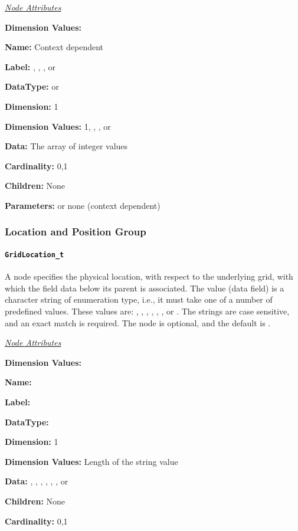 \textit{\uline{Node Attributes}}
\begin{Ventryic}{\textbf{Dimension Values:}}
\raggedright
\item [\textbf{Name:}]
      Context dependent
\item [\textbf{Label:}]
      , , ,
      or 
\item [\textbf{DataType:}]
       or 
\item [\textbf{Dimension:}]
      1
\item [\textbf{Dimension Values:}]
      1, , , or
\item [\textbf{Data:}]
      The array of integer values
\item [\textbf{Cardinality:}]
      0,1
\item [\textbf{Children:}]
      None
\item [\textbf{Parameters:}]
       or none (context dependent)
\end{Ventryic}

\subsubsection{Location and Position Group}

\paragraph{\texttt{GridLocation\_t}}

A  node specifies the physical location, with
respect to the underlying grid, with which the field data below
its parent is associated. The value (data field) is a character
string of enumeration type, i.e., it must take one of a number of
predefined values. These values are: , ,
, , ,
, or . The strings are case
sensitive, and an exact match is required. The 
node is optional, and the default is .

\newpage
\textit{\uline{Node Attributes}}
\begin{Ventryic}{\textbf{Dimension Values:}}
\raggedright
\item [\textbf{Name:}]
\item [\textbf{Label:}]
\item [\textbf{DataType:}]
\item [\textbf{Dimension:}]
      1
\item [\textbf{Dimension Values:}]
      Length of the string value
\item [\textbf{Data:}]
      , , , ,
      , , or 
\item [\textbf{Children:}]
      None
\item [\textbf{Cardinality:}]
      0,1
\end{Ventryic}

